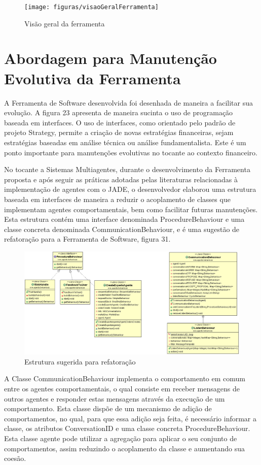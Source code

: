 \begin{figure}[h]
\centering
\label{f30}
\texttt{[image: figuras/visaoGeralFerramenta]}
\caption{Visão geral da ferramenta}
\end{figure}
\FloatBarrier


\section{Abordagem para Manutenção Evolutiva da Ferramenta}

A Ferramenta de Software desenvolvida foi desenhada de maneira a facilitar sua evolução. A figura 23 apresenta de maneira sucinta o uso de programação baseada em interfaces. O uso de interfaces, como orientado pelo padrão de projeto Strategy, permite a criação de novas estratégias financeiras, sejam estratégias baseadas em análise técnica ou análise fundamentalista. Este é um ponto importante para manutenções evolutivas no tocante ao contexto financeiro.

No tocante a Sistemas Multiagentes, durante o desenvolvimento da Ferramenta proposta e após seguir as práticas adotadas pelas literaturas relacionadas à implementação de agentes com o JADE, o desenvolvedor elaborou uma estrutura baseada em interfaces de maneira a reduzir o acoplamento de classes que implementam agentes comportamentais, bem como facilitar futuras manutenções. Esta estrutura contém uma interface denominada ProcedureBehaviour e uma classe concreta denominada CommunicationBehaviour, e é uma sugestão de refatoração para a Ferramenta de Software, figura 31.

\begin{figure}[h]
\centering
\label{f31}
\includegraphics[width=1\textwidth]{figuras/pacoteBehaviours}
\caption{Estrutura sugerida para refatoração}
\end{figure}
\FloatBarrier

A Classe CommunicationBehaviour implementa o comportamento em comum entre os agentes comportamentais, o qual consiste em receber mensagens de outros agentes e responder estas mensagens através da execução de um comportamento. Esta classe dispõe de um mecanismo de adição de comportamentos, no qual, para que essa adição seja feita, é necessário informar a classe, os atributos ConversationID e uma classe concreta ProcedureBehaviour. Esta classe agente pode utilizar a agregação para aplicar o seu conjunto de comportamentos, assim reduzindo o acoplamento da classe e aumentando sua coesão.

